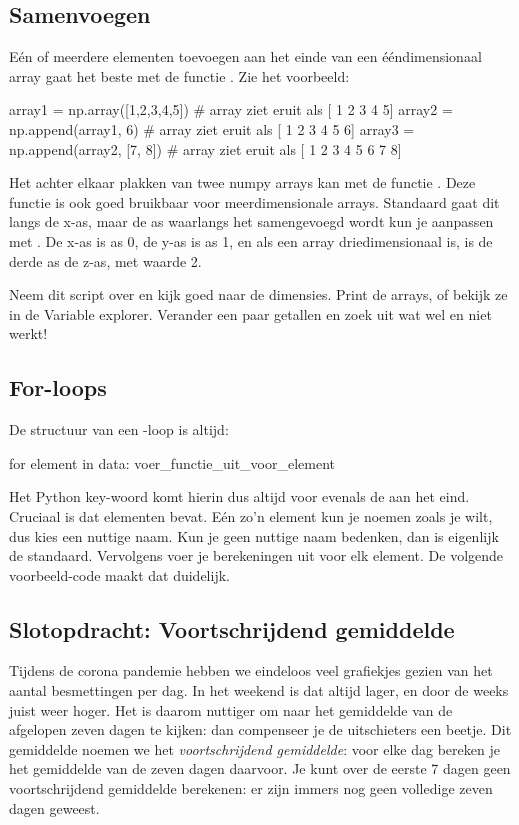 \documentclass[a4paper,11pt, fleqn]{article}
\begin{document}
\subsection{Samenvoegen}
E\'en of meerdere elementen toevoegen aan het einde van een \'e\'endimensionaal array gaat het beste met de functie . Zie het voorbeeld:

\begin{python}
array1 = np.array([1,2,3,4,5])	   # array ziet eruit als [ 1 2 3 4 5]
array2 = np.append(array1, 6)	   # array ziet eruit als [ 1 2 3 4 5 6]
array3 = np.append(array2, [7, 8]) # array ziet eruit als [ 1 2 3 4 5 6 7 8]
\end{python}

Het achter elkaar plakken van twee numpy arrays kan met de functie . Deze functie is ook goed bruikbaar voor meerdimensionale arrays. Standaard gaat dit langs de x-as, maar de as waarlangs het samengevoegd wordt kun je aanpassen met . De x-as is as 0, de y-as is as 1, en als een array driedimensionaal is, is de derde as de z-as, met waarde 2.


Neem dit script over en kijk goed naar de dimensies. Print de arrays, of bekijk ze in de Variable explorer. Verander een paar getallen en zoek uit wat wel en niet werkt!
\fi

\subsection{For-loops}

De structuur van een -loop is altijd:
\begin{python}
for element in data:
	voer_functie_uit_voor_element
\end{python}
Het Python key-woord  komt hierin dus altijd voor evenals de \pythoninline{:} aan het eind. Cruciaal is dat  elementen bevat. E\'en zo'n element kun je noemen zoals je wilt, dus kies een nuttige naam. Kun je geen nuttige naam bedenken, dan is  eigenlijk de standaard. Vervolgens voer je berekeningen uit voor elk element. De volgende voorbeeld-code maakt dat duidelijk.


\subsection{Slotopdracht: Voortschrijdend gemiddelde}
Tijdens de corona pandemie hebben we eindeloos veel grafiekjes gezien van het aantal besmettingen per dag. In het weekend is dat altijd lager, en door de weeks juist weer hoger. Het is daarom nuttiger om naar het gemiddelde van de afgelopen zeven dagen te kijken: dan compenseer je de uitschieters een beetje. Dit gemiddelde noemen we het {\it voortschrijdend gemiddelde}: voor elke dag bereken je het gemiddelde van de zeven dagen daarvoor. Je kunt over de eerste 7 dagen geen voortschrijdend gemiddelde berekenen: er zijn immers nog geen volledige zeven dagen geweest.
\end{document}
